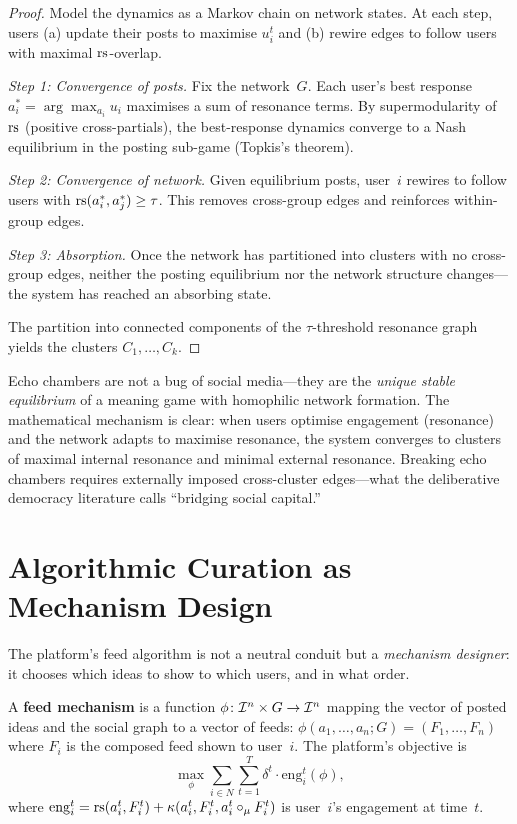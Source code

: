 \begin{proof}
Model the dynamics as a Markov chain on network states.  At each step,
users (a) update their posts to maximise $u_i^t$ and (b) rewire
edges to follow users with maximal $\mathrm{rs}$-overlap.

\emph{Step 1: Convergence of posts.}  Fix the network~$G$.
Each user's best response $a_i^* = \arg\max_{a_i} u_i$
maximises a sum of resonance terms.  By supermodularity of~$\mathrm{rs}$
(positive cross-partials), the best-response dynamics converge to
a Nash equilibrium in the posting sub-game (Topkis's theorem).

\emph{Step 2: Convergence of network.}  Given equilibrium posts,
user~$i$ rewires to follow users with $\mathrm{rs}(a_i^*, a_j^*) \ge \tau$.
This removes cross-group edges and reinforces within-group edges.

\emph{Step 3: Absorption.}  Once the network has partitioned into
clusters with no cross-group edges, neither the posting equilibrium
nor the network structure changes---the system has reached an
absorbing state.

The partition into connected components of the $\tau$-threshold
resonance graph yields the clusters $C_1, \ldots, C_k$.
\end{proof}

\begin{interpretation}
Echo chambers are not a bug of social media---they are the
\emph{unique stable equilibrium} of a meaning game with homophilic
network formation.  The mathematical mechanism is clear: when users
optimise engagement (resonance) and the network adapts to
maximise resonance, the system converges to clusters of maximal
internal resonance and minimal external resonance.  Breaking echo
chambers requires externally imposed cross-cluster edges---what
the deliberative democracy literature calls ``bridging social
capital.''
\end{interpretation}

\section{Algorithmic Curation as Mechanism Design}
\label{sec:algorithmic}

The platform's feed algorithm is not a neutral conduit but a
\emph{mechanism designer}: it chooses which ideas to show to
which users, and in what order.

\begin{definition}
\label{def:feed-mechanism}
A \textbf{feed mechanism} is a function $\phi \colon \mathcal{I}^n
\times G \to \mathcal{I}^n$ mapping the vector of posted ideas and the
social graph to a vector of feeds: $\phi(a_1,\ldots,a_n; G) =
(F_1, \ldots, F_n)$ where $F_i$ is the composed feed shown
to user~$i$.  The platform's objective is
\[
  \max_\phi \sum_{i \in N} \sum_{t=1}^T
  \delta^t \cdot \mathrm{eng}_i^t(\phi),
\]
where $\mathrm{eng}_i^t = \mathrm{rs}(a_i^t, F_i^t) +
\kappa(a_i^t, F_i^t, a_i^t \circ_\mu F_i^t)$ is user~$i$'s
engagement at time~$t$.
\end{definition}

